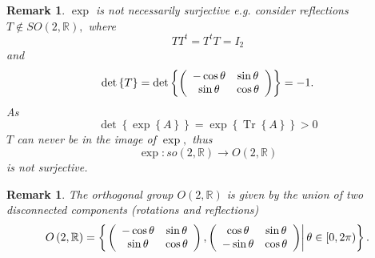 \documentclass[aps,preprint]{revtex4}%
\newtheorem{remark}[theorem]{Remark}
\begin{document}
\begin{remark}
$\exp$ is \emph{not necessarily surjective} e.g. consider reflections $T\notin
SO\left(  2,\mathbb{R}\right)  ,$ where
\begin{equation}
TT^{t}=T^{t}T=I_{2}%
\end{equation}
and%
\begin{equation}
\det\left\{  T\right\}  =\det\left\{  \left(
\begin{array}
[c]{cc}%
-\cos\theta & \sin\theta\\
\sin\theta & \cos\theta
\end{array}
\right)  \right\}  =-1.
\end{equation}
As
\begin{equation}
\det\left\{  \exp\left\{  A\right\}  \right\}  =\exp\left\{  \operatorname{Tr}%
\left\{  A\right\}  \right\}  >0
\end{equation}
$T$ can never be in the image of $\exp,$ thus
\begin{equation}
\exp:so\left(  2,\mathbb{R}\right)  \rightarrow O\left(  2,\mathbb{R}\right)
\end{equation}
is not surjective.
\end{remark}

\begin{remark}
The orthogonal group $O\left(  2,\mathbb{R}\right)  $ is given by the union of
two disconnected components (rotations and reflections)
\begin{equation}
O\left(  2,\mathbb{R}\right)  =\left\{  \left.  \left(
\begin{array}
[c]{cc}%
-\cos\theta & \sin\theta\\
\sin\theta & \cos\theta
\end{array}
\right)  ,\left(
\begin{array}
[c]{cc}%
\cos\theta & \sin\theta\\
-\sin\theta & \cos\theta
\end{array}
\right)  \right\vert \theta\in\left[  0,2\pi\right)  \right\}  .
\end{equation}

\end{remark}
\end{document}
